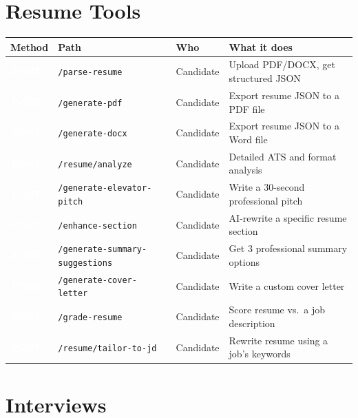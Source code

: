 \documentclass[12pt, a4paper]{report}
\newcommand{\code}[1]{\texttt{\small #1}}
\newcommand{\badge}[2]{%
  \colorbox{#1}{\textcolor{white}{\tiny\bfseries\,#2\,}}%
}
\newcommand{\POST}{\badge{infoblue}{POST}}
\begin{document}
{%
\section{Resume Tools}

\begin{longtable}{p{1.5cm}p{5.5cm}p{2.2cm}p{5.5cm}}
\toprule
\textbf{Method} & \textbf{Path} & \textbf{Who} & \textbf{What it does} \\
\midrule
\endhead
\POST & \code{/parse-resume}               & Candidate & Upload PDF/DOCX, get structured JSON \\
\POST & \code{/generate-pdf}               & Candidate & Export resume JSON to a PDF file \\
\POST & \code{/generate-docx}              & Candidate & Export resume JSON to a Word file \\
\POST & \code{/resume/analyze}             & Candidate & Detailed ATS and format analysis \\
\POST & \code{/generate-elevator-pitch}    & Candidate & Write a 30-second professional pitch \\
\POST & \code{/enhance-section}            & Candidate & AI-rewrite a specific resume section \\
\POST & \code{/generate-summary-suggestions}& Candidate& Get 3 professional summary options \\
\POST & \code{/generate-cover-letter}      & Candidate & Write a custom cover letter \\
\POST & \code{/grade-resume}               & Candidate & Score resume vs.\ a job description \\
\POST & \code{/resume/tailor-to-jd}        & Candidate & Rewrite resume using a job's keywords \\
\bottomrule
\end{longtable}

\section{Interviews}

}
\end{document}
